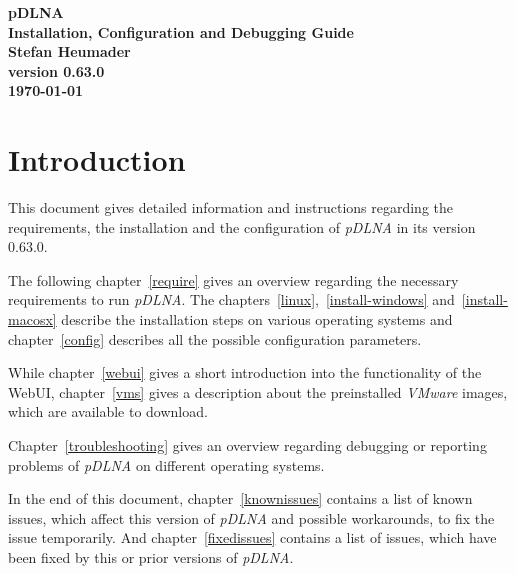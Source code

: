 \documentclass[a4paper,oneside,10pt]{report}
\newcommand{\pDLNAversion}{0.63.0}
\begin{document}
\pagestyle{empty}

\thispagestyle{empty}
\begin{center}
\Huge{\textbf{pDLNA}}\\
\vspace{0.5cm}
\Large{\textbf{Installation, Configuration and Debugging Guide}}\\
\vspace{2cm}
\large{\textbf{Stefan Heumader}}\\
\vspace{1cm}
\large{\textbf{version \pDLNAversion}}\\
\vspace{0.5cm}
\large{\textbf{\today}}\\
\end{center}

\tableofcontents
\cleardoublepage

\pagestyle{headings}

%
%

\chapter{Introduction}

This document gives detailed information and instructions regarding the requirements, the installation and the configuration of {\em pDLNA} in its version \pDLNAversion.

The following chapter~\ref{require} gives an overview regarding the necessary requirements to run {\em pDLNA}. The chapters~\ref{linux},~\ref{install-windows} and~\ref{install-macosx} describe the installation steps on various operating systems and chapter~\ref{config} describes all the possible configuration parameters.

While chapter~\ref{webui} gives a short introduction into the functionality of the WebUI, chapter~\ref{vms} gives a description about the preinstalled {\em VMware} images, which are available to download.

Chapter~\ref{troubleshooting} gives an overview regarding debugging or reporting problems of {\em pDLNA} on different operating systems.

In the end of this document, chapter~\ref{knownissues} contains a list of known issues, which affect this version of {\em pDLNA} and possible workarounds, to fix the issue temporarily. And chapter~\ref{fixedissues} contains a list of issues, which have been fixed by this or prior versions of {\em pDLNA}.
\end{document}
